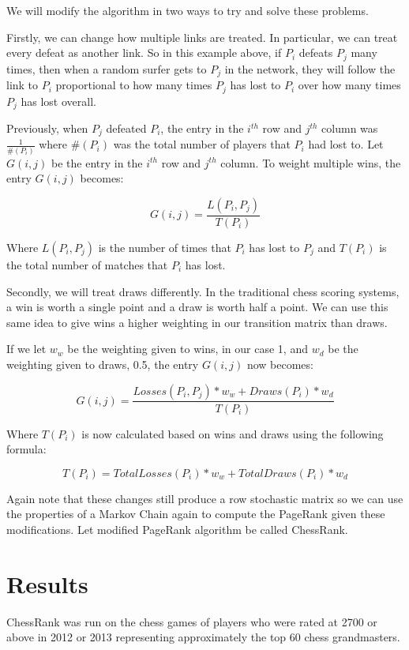\documentclass[pdftex,11pt,a4paper]{report}
\begin{document}
We will modify the algorithm in two ways to try and solve these problems.

Firstly, we can change how multiple links are treated. In particular, we can treat every defeat as another link.
So in this example above, if $P_i$ defeats $P_j$ many times, then when a random surfer gets to
$P_j$ in the network, they will follow the link to $P_i$ proportional to how many times $P_j$ has lost
to $P_i$ over how many times $P_j$ has lost overall.

Previously, when $P_j$ defeated $P_i$, the entry in the $i^{th}$ row and $j^{th}$ column
was $\frac{1}{\#(P_i)}$ where $\#(P_i)$ was the total number of players that $P_i$ had lost to. 
Let $G(i, j)$ be the entry in the $i^{th}$ row and $j^{th}$ column. To weight multiple wins, the entry $G(i, j)$ becomes:

$$
   G(i, j) = \dfrac{L(P_i, P_j)}{ T(P_i)  }
$$

Where $L(P_i, P_j)$ is the number of times that $P_i$ has lost to $P_j$ and $T(P_i)$ is the total number of matches that $P_i$ has lost.

Secondly, we will treat draws differently.
In the traditional chess scoring systems, a win is worth a single point and a draw is worth half a point. We can use this
same idea to give wins a higher weighting in our transition matrix than draws. 

If we let $w_w$ be the weighting given to wins, in our case 1, and $w_d$ be the weighting given to draws, 0.5, the entry $G(i, j)$ now becomes:

$$
G(i, j) = \dfrac{Losses(P_i, P_j) * w_w + Draws(P_i) * w_d}{ T(P_i) }
$$

Where $T(P_i)$ is now calculated based on wins and draws using the following formula:

$$
   T(P_i) = TotalLosses(P_i) * w_w + TotalDraws(P_i) * w_d 
$$

Again note that these changes still produce a row stochastic matrix so we can use the properties of a Markov Chain again
to compute the PageRank given these modifications. Let modified PageRank algorithm be called ChessRank.

\section{Results}

ChessRank was run on the chess games of players who were rated at 2700 or above in 2012 or 2013 
representing approximately the top 60 chess grandmasters.
\end{document}
